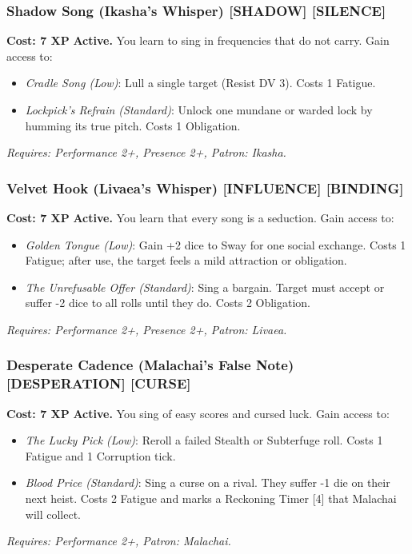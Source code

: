 \subsubsection*{Shadow Song (Ikasha's Whisper) \textnormal{[SHADOW] [SILENCE]}}
\label{talent:shadow-song}
\textbf{Cost: 7 XP} \textbf{Active.} You learn to sing in frequencies that do not carry. Gain access to:
\begin{itemize}
\item \textit{Cradle Song (Low)}: Lull a single target (Resist DV 3). Costs 1 Fatigue.
\item \textit{Lockpick's Refrain (Standard)}: Unlock one mundane or warded lock by humming its true pitch. Costs 1 Obligation.
\end{itemize}
\textit{Requires: Performance 2+, Presence 2+, Patron: Ikasha.}

\subsubsection*{Velvet Hook (Livaea's Whisper) \textnormal{[INFLUENCE] [BINDING]}}
\label{talent:velvet-hook}
\textbf{Cost: 7 XP} \textbf{Active.} You learn that every song is a seduction. Gain access to:
\begin{itemize}
\item \textit{Golden Tongue (Low)}: Gain +2 dice to Sway for one social exchange. Costs 1 Fatigue; after use, the target feels a mild attraction or obligation.
\item \textit{The Unrefusable Offer (Standard)}: Sing a bargain. Target must accept or suffer -2 dice to all rolls until they do. Costs 2 Obligation.
\end{itemize}
\textit{Requires: Performance 2+, Presence 2+, Patron: Livaea.}

\subsubsection*{Desperate Cadence (Malachai's False Note) \textnormal{[DESPERATION] [CURSE]}}
\label{talent:desperate-cadence}
\textbf{Cost: 7 XP} \textbf{Active.} You sing of easy scores and cursed luck. Gain access to:
\begin{itemize}
\item \textit{The Lucky Pick (Low)}: Reroll a failed Stealth or Subterfuge roll. Costs 1 Fatigue and 1 Corruption tick.
\item \textit{Blood Price (Standard)}: Sing a curse on a rival. They suffer -1 die on their next heist. Costs 2 Fatigue and marks a Reckoning Timer [4] that Malachai will collect.
\end{itemize}
\textit{Requires: Performance 2+, Patron: Malachai.}

